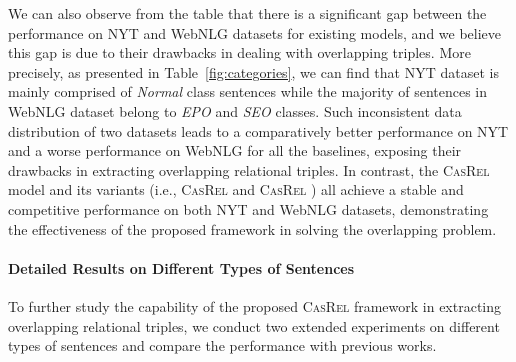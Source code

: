 \documentclass[11pt,a4paper]{article}
\begin{document}
\par We can also observe from the table that there is a significant gap between the performance on NYT and WebNLG datasets for existing models, and we believe this gap is due to their drawbacks in dealing with overlapping triples. More precisely, as presented in Table~\ref{fig:categories}, we can find that NYT dataset is mainly comprised of \emph{Normal} class sentences while the majority of sentences in WebNLG dataset belong to \emph{EPO} and \emph{SEO} classes. Such inconsistent data distribution of two datasets leads to a comparatively better performance on NYT and a worse performance on WebNLG for all the baselines, exposing their drawbacks in extracting overlapping relational triples. In contrast, the \textsc{CasRel} model and its variants (i.e., \textsc{CasRel} and \textsc{CasRel} ) all achieve a stable and competitive performance on both NYT and WebNLG datasets, demonstrating the effectiveness of the proposed framework in solving the overlapping problem.

\paragraph{Detailed Results on Different Types of Sentences} \label{analysis}
To further study the capability of the proposed \textsc{CasRel} framework in extracting overlapping relational triples, we conduct two extended experiments on different types of sentences and compare the performance with previous works.
\end{document}
